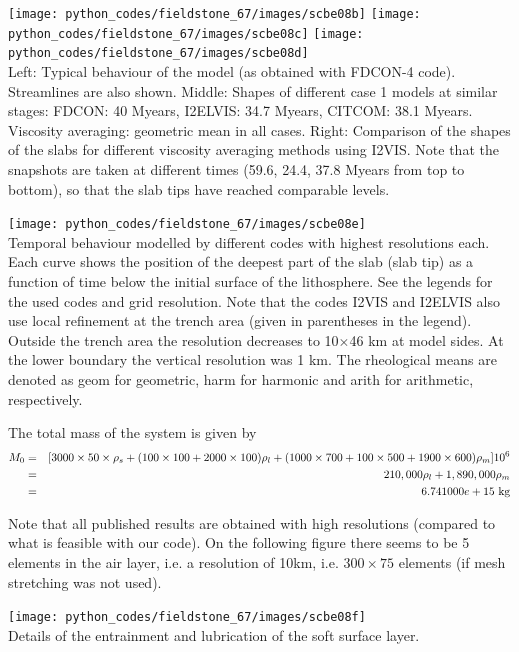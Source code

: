 \begin{center}
\texttt{[image: python\_codes/fieldstone\_67/images/scbe08b]}
\texttt{[image: python\_codes/fieldstone\_67/images/scbe08c]}
\texttt{[image: python\_codes/fieldstone\_67/images/scbe08d]}\\
{\captionfont Left: Typical behaviour of the model (as obtained with FDCON-4 code). 
Streamlines are also shown.
Middle: Shapes of different case 1 models at similar stages: FDCON: 40 Myears,
I2ELVIS: 34.7 Myears, CITCOM: 38.1 Myears. Viscosity averaging: geometric mean
in all cases.
Right: Comparison of the shapes of the slabs for different viscosity averaging methods 
using I2VIS. Note that the snapshots are taken at different times (59.6, 24.4,
37.8 Myears from top to bottom), so that the slab tips have reached comparable
levels.}
\end{center}

\begin{center}
\texttt{[image: python\_codes/fieldstone\_67/images/scbe08e]}\\
{\captionfont 
Temporal behaviour modelled by different codes with highest resolutions each. 
Each curve shows the position of the deepest part of the slab (slab tip) as
a function of time below the initial surface of the lithosphere. 
See the legends for the used codes and grid resolution. 
Note that the codes I2VIS and I2ELVIS also use local
refinement at the trench area (given in parentheses in the legend). 
Outside the trench area the resolution decreases to 10$\times$46 km at model sides. 
At the lower boundary the vertical resolution was 1 km. 
The rheological means are denoted as geom for geometric, harm for harmonic 
and arith for arithmetic, respectively. }
\end{center}

The total mass of the system is given by
\begin{eqnarray}
M_0 &=& [3000\times 50\times \rho_s + (100\times 100+ 2000\times 100)\rho_l + 
(1000\times 700 + 100\times 500 + 1900\times 600)\rho_m] 10^6\nn\\
&=&210,000 \rho_l + 1,890,000 \rho_m \nn\\
&=&6.741000e+15~\si{\kg}
\end{eqnarray}

Note that all published results are obtained with high resolutions (compared to what is 
feasible with our code). On the following figure there seems to be 5 elements in the air layer, 
i.e. a resolution of 10km, i.e. $300\times 75$ elements (if mesh stretching was not used).
\begin{center}
\texttt{[image: python\_codes/fieldstone\_67/images/scbe08f]}\\
{\captionfont Details of the entrainment and lubrication of the soft surface layer.}
\end{center}


